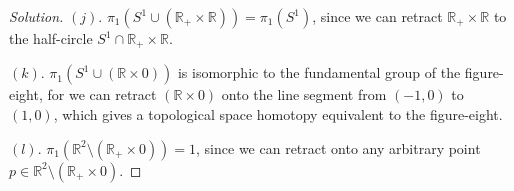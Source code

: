 \documentclass[12pt]{article}
\theoremstyle{remark}
\begin{document}
\begin{proof}[Solution]
  \par $(j)$. $\pi_1(S^1 \cup (\mathbb{R}_+ \times \mathbb{R})) = \pi_1(S^1)$, since we can retract $\mathbb{R}_+ \times \mathbb{R}$ to the half-circle $S^1 \cap \mathbb{R}_+ \times \mathbb{R}$.
  \par $(k)$. $\pi_1(S^1 \cup (\mathbb{R} \times 0))$ is isomorphic to the
  fundamental group of the figure-eight, for we can retract $(\mathbb{R} \times
  0)$ onto the line segment from $(-1,0)$ to $(1,0)$, which gives a topological
  space homotopy equivalent to the figure-eight.
  \par $(l)$. $\pi_1(\mathbb{R}^2 \setminus (\mathbb{R}_+ \times 0)) = 1$, since we can retract onto any arbitrary point $p \in \mathbb{R}^2 \setminus (\mathbb{R}_+ \times 0)$.
\end{proof}
\end{document}
